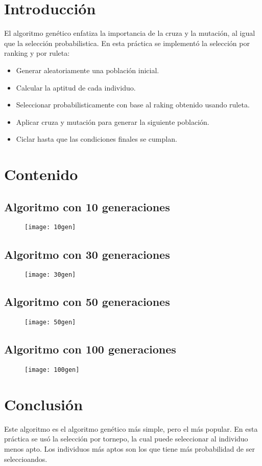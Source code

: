 \documentclass{article}
\begin{document}
\maketitle
\tableofcontents
\section{Introducción}
El algoritmo genético enfatiza la importancia de la cruza y la mutación, al igual que la selección probabilistica.
En esta práctica se implementó la selección por ranking y por ruleta:
\begin{itemize}
	\item Generar aleatoriamente una población inicial.
	\item Calcular la aptitud de cada individuo.
	\item Seleccionar probabilisticamente con base al raking obtenido usando ruleta.
	\item Aplicar cruza y mutación para generar la siguiente población.
	\item Ciclar hasta que las condiciones finales se cumplan.
\end{itemize}
\newpage
\section{Contenido}
\subsection{Algoritmo con 10 generaciones}
\begin{figure}[h!]
	\centering
	\texttt{[image: 10gen]}
\end{figure}
\newpage
\subsection{Algoritmo con 30 generaciones}
\begin{figure}[h!]
	\centering
	\texttt{[image: 30gen]}
\end{figure}
\newpage
\subsection{Algoritmo con 50 generaciones}
\begin{figure}[h!]
	\centering
	\texttt{[image: 50gen]}
\end{figure}
\newpage
\subsection{Algoritmo con 100 generaciones}
\begin{figure}[h!]
	\centering
	\texttt{[image: 100gen]}
\end{figure}
\section{Conclusión}
Este algoritmo es el algoritmo genético más simple, pero el más popular. En esta práctica se usó la selección por tornepo, la cual puede seleccionar al individuo menos apto. Los individuos más aptos son los que tiene más probabilidad de ser seleccioandos.
\end{document}
